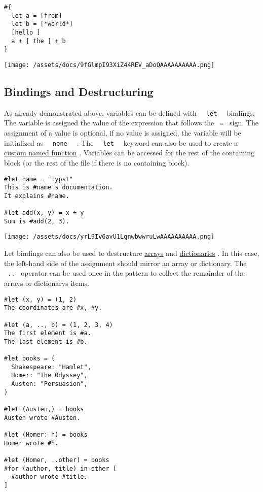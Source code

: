 \begin{verbatim}
#{
  let a = [from]
  let b = [*world*]
  [hello ]
  a + [ the ] + b
}
\end{verbatim}

\texttt{[image: /assets/docs/9fGlmpI93XiZ44REV\_aDoQAAAAAAAAAA.png]}

\subsection{Bindings and Destructuring}\label{bindings}

As already demonstrated above, variables can be defined with
\texttt{\ }{\texttt{\ let\ }}\texttt{\ } bindings. The variable is
assigned the value of the expression that follows the \texttt{\ =\ }
sign. The assignment of a value is optional, if no value is assigned,
the variable will be initialized as
\texttt{\ }{\texttt{\ none\ }}\texttt{\ } . The
\texttt{\ }{\texttt{\ let\ }}\texttt{\ } keyword can also be used to
create a
\href{/docs/reference/foundations/function/\#defining-functions}{custom
named function} . Variables can be accessed for the rest of the
containing block (or the rest of the file if there is no containing
block).

\begin{verbatim}
#let name = "Typst"
This is #name's documentation.
It explains #name.

#let add(x, y) = x + y
Sum is #add(2, 3).
\end{verbatim}

\texttt{[image: /assets/docs/yrL9Iv6avU1LgnwbwwruLwAAAAAAAAAA.png]}

Let bindings can also be used to destructure
\href{/docs/reference/foundations/array/}{arrays} and
\href{/docs/reference/foundations/dictionary/}{dictionaries} . In this
case, the left-hand side of the assignment should mirror an array or
dictionary. The \texttt{\ ..\ } operator can be used once in the pattern
to collect the remainder of the array\textquotesingle s or
dictionary\textquotesingle s items.

\begin{verbatim}
#let (x, y) = (1, 2)
The coordinates are #x, #y.

#let (a, .., b) = (1, 2, 3, 4)
The first element is #a.
The last element is #b.

#let books = (
  Shakespeare: "Hamlet",
  Homer: "The Odyssey",
  Austen: "Persuasion",
)

#let (Austen,) = books
Austen wrote #Austen.

#let (Homer: h) = books
Homer wrote #h.

#let (Homer, ..other) = books
#for (author, title) in other [
  #author wrote #title.
]
\end{verbatim}

